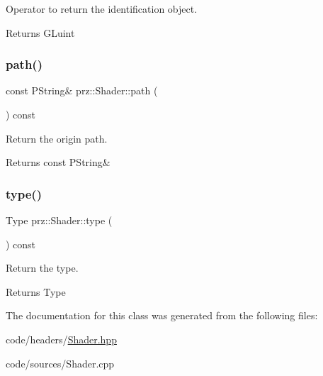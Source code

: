 Operator to return the identification object. 

\begin{DoxyReturn}{Returns}
G\+Luint 
\end{DoxyReturn}
\mbox{\label{classprz_1_1_shader_a16e80489a6a0ad68daa3524eb844f1e2}} 
\subsubsection{\texorpdfstring{path()}{path()}}
{\footnotesize\ttfamily const P\+String\& prz\+::\+Shader\+::path (\begin{DoxyParamCaption}{ }\end{DoxyParamCaption}) const\hspace{0.3cm}{\ttfamily [inline]}}



Return the origin path. 

\begin{DoxyReturn}{Returns}
const P\+String\& 
\end{DoxyReturn}
\mbox{\label{classprz_1_1_shader_a2bfab69158c791e4a34942abd593c889}} 
\subsubsection{\texorpdfstring{type()}{type()}}
{\footnotesize\ttfamily Type prz\+::\+Shader\+::type (\begin{DoxyParamCaption}{ }\end{DoxyParamCaption}) const\hspace{0.3cm}{\ttfamily [inline]}}



Return the type. 

\begin{DoxyReturn}{Returns}
Type 
\end{DoxyReturn}


The documentation for this class was generated from the following files\+:\begin{DoxyCompactItemize}
\item 
code/headers/\mbox{\hyperlink{_shader_8hpp}{Shader.\+hpp}}\item 
code/sources/Shader.\+cpp\end{DoxyCompactItemize}

